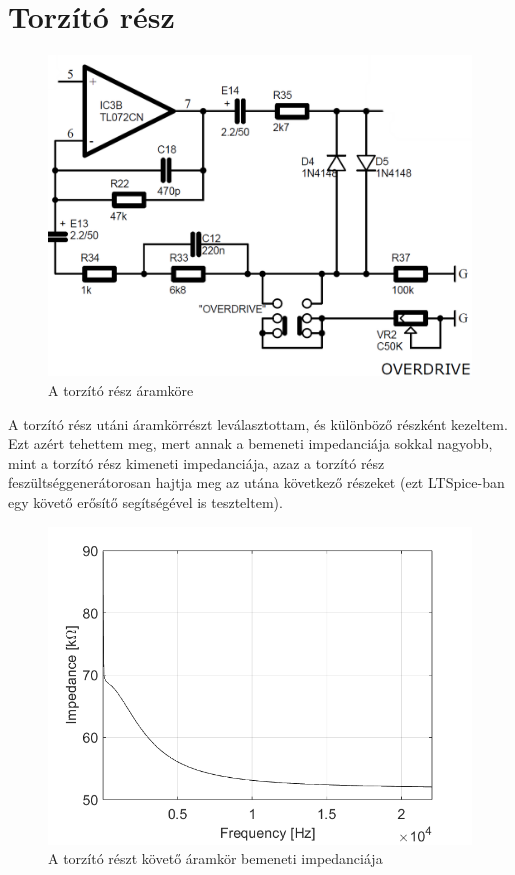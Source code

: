\section{Torzító rész}
\begin{figure}[H]
    \centering
    \includegraphics[scale=0.35]{figures/stage3.png}
    \caption{A torzító rész áramköre}
\end{figure}

A torzító rész utáni áramkörrészt leválasztottam, és különböző részként kezeltem. Ezt azért tehettem meg, mert annak a bemeneti impedanciája sokkal nagyobb, mint a torzító rész kimeneti impedanciája, azaz a torzító rész feszültséggenerátorosan hajtja meg az utána következő részeket (ezt LTSpice-ban egy követő erősítő segítségével is teszteltem).
\begin{figure}[H]
    \centering
    \includegraphics[scale=0.5]{figures/res.png}
    \caption{A torzító részt követő áramkör bemeneti impedanciája}
\end{figure}

